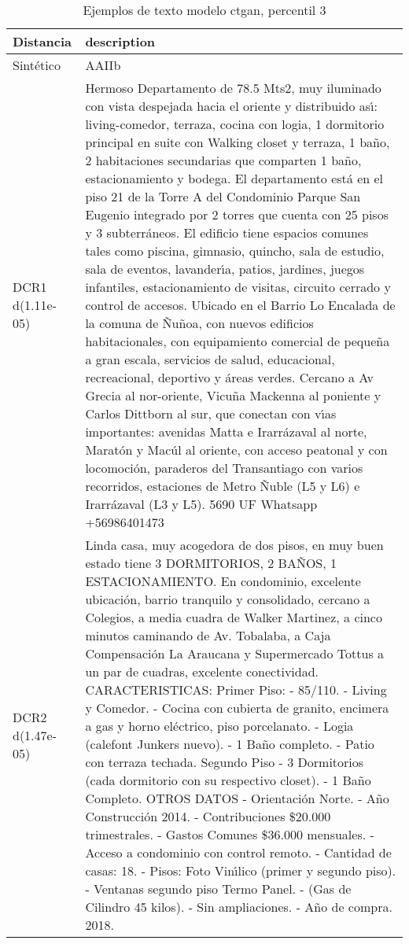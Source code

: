 \begin{table}[H]
\centering
\fontsize{10}{14}\selectfont
\caption{Ejemplos de texto modelo ctgan, percentil 3}
\label{table-example-economicos-a-1-ctgan-3p-text}
\begin{tabular}{|l|m{35em}|}
\hline
\rowcolor[gray]{0.8}
Distancia & description \\
\hline Sintético & AAIIb \\
\hline DCR1 d(1.11e-05) & Hermoso Departamento de 78.5 Mts2, muy iluminado con vista despejada hacia el oriente y distribuido as{\'\i}: living-comedor, terraza, cocina con logia, 1 dormitorio principal en suite con Walking closet y terraza, 1 ba\~no, 2 habitaciones secundarias que comparten 1 ba\~no, estacionamiento y bodega. El departamento est\'a en el piso 21 de la Torre A del Condominio Parque San Eugenio integrado por 2 torres que cuenta con 25 pisos y 3 subterr\'aneos.  El edificio tiene espacios comunes tales como piscina, gimnasio, quincho, sala de estudio, sala de eventos, lavander{\'\i}a, patios, jardines, juegos infantiles, estacionamiento de visitas, circuito cerrado y control de accesos. Ubicado en el Barrio Lo Encalada de la comuna de \~Nu\~noa, con nuevos edificios habitacionales, con equipamiento comercial de peque\~na a gran escala, servicios de salud, educacional, recreacional, deportivo y \'areas verdes. Cercano a Av Grecia al nor-oriente, Vicu\~na Mackenna al poniente y Carlos Dittborn al sur, que conectan con v{\'\i}as importantes: avenidas Matta e Irarr\'azaval al norte, Marat\'on y Mac\'ul al oriente, con acceso peatonal y con locomoci\'on, paraderos del Transantiago con varios recorridos, estaciones de Metro \~Nuble (L5 y L6) e Irarr\'azaval (L3 y L5).  5690 UF Whatsapp +56986401473 \\
\hline DCR2 d(1.47e-05) & Linda casa, muy acogedora de dos pisos, en muy buen estado tiene 3 DORMITORIOS, 2 BA\~NOS, 1 ESTACIONAMIENTO. En condominio, excelente ubicaci\'on, barrio tranquilo y consolidado, cercano a Colegios, a media cuadra de Walker Martinez, a cinco minutos caminando de Av. Tobalaba, a Caja Compensaci\'on La Araucana y Supermercado Tottus a un par de cuadras, excelente conectividad.   CARACTERISTICAS:  Primer Piso: - 85/110. - Living y Comedor. - Cocina con cubierta de granito, encimera a gas y horno el\'ectrico, piso porcelanato. - Logia (calefont Junkers nuevo). - 1 Ba\~no completo. - Patio con terraza techada.  Segundo Piso - 3 Dormitorios (cada dormitorio con su respectivo closet). - 1 Ba\~no Completo.  OTROS DATOS - Orientaci\'on Norte. - A\~no Construcci\'on 2014. - Contribuciones \$20.000 trimestrales. - Gastos Comunes \$36.000 mensuales. - Acceso a condominio con control remoto. - Cantidad de casas: 18. - Pisos: Foto Vin{\'\i}lico (primer y segundo piso). - Ventanas segundo piso Termo Panel. - (Gas de Cilindro 45 kilos). - Sin ampliaciones. - A\~no de compra. 2018. \\
\hline
\end{tabular}
\end{table}
